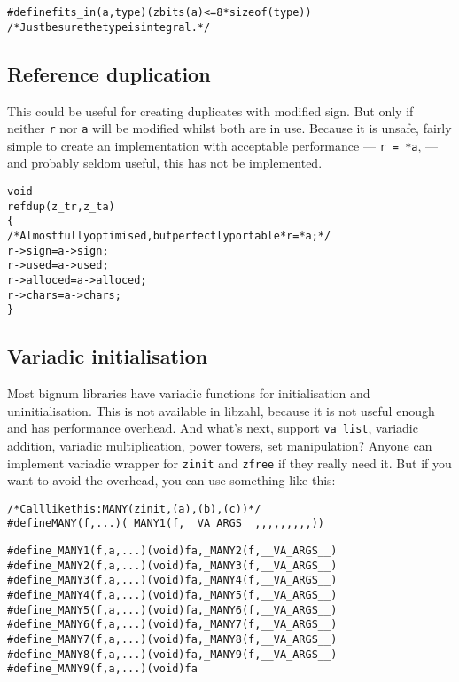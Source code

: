 \begin{alltt}
   #define fits_in(a, type)  (zbits(a) <= 8 * sizeof(type))
   \textcolor{c}{/* \textrm{Just be sure the type is integral.} */}
\end{alltt}


\subsection{Reference duplication}
\label{sec:Reference duplication}

This could be useful for creating duplicates
with modified sign. But only if neither
{\tt r} nor {\tt a} will be modified whilst
both are in use. Because it is unsafe,
fairly simple to create an implementation
with acceptable performance — {\tt *r = *a},
— and probably seldom useful, this has not
be implemented.

\begin{alltt}
   void
   refdup(z_t r, z_t a)
   \{
       \textcolor{c}{/* \textrm{Almost fully optimised, but perfectly portable} *r = *a; */}
       r->sign    = a->sign;
       r->used    = a->used;
       r->alloced = a->alloced;
       r->chars   = a->chars;
   \}
\end{alltt}


\subsection{Variadic initialisation}
\label{sec:Variadic initialisation}

Most bignum libraries have variadic functions
for initialisation and uninitialisation. This
is not available in libzahl, because it is
not useful enough and has performance overhead.
And what's next, support {\tt va\_list},
variadic addition, variadic multiplication,
power towers, set manipulation? Anyone can
implement variadic wrapper for {\tt zinit} and
{\tt zfree} if they really need it. But if
you want to avoid the overhead, you can use
something like this:

\begin{alltt}
   /* \textrm{Call like this:} MANY(zinit, (a), (b), (c)) */
   #define MANY(f, ...)  (_MANY1(f, __VA_ARGS__,,,,,,,,,))
   
   #define _MANY1(f, a, ...)  (void)f a, _MANY2(f, __VA_ARGS__)
   #define _MANY2(f, a, ...)  (void)f a, _MANY3(f, __VA_ARGS__)
   #define _MANY3(f, a, ...)  (void)f a, _MANY4(f, __VA_ARGS__)
   #define _MANY4(f, a, ...)  (void)f a, _MANY5(f, __VA_ARGS__)
   #define _MANY5(f, a, ...)  (void)f a, _MANY6(f, __VA_ARGS__)
   #define _MANY6(f, a, ...)  (void)f a, _MANY7(f, __VA_ARGS__)
   #define _MANY7(f, a, ...)  (void)f a, _MANY8(f, __VA_ARGS__)
   #define _MANY8(f, a, ...)  (void)f a, _MANY9(f, __VA_ARGS__)
   #define _MANY9(f, a, ...)  (void)f a
\end{alltt}
